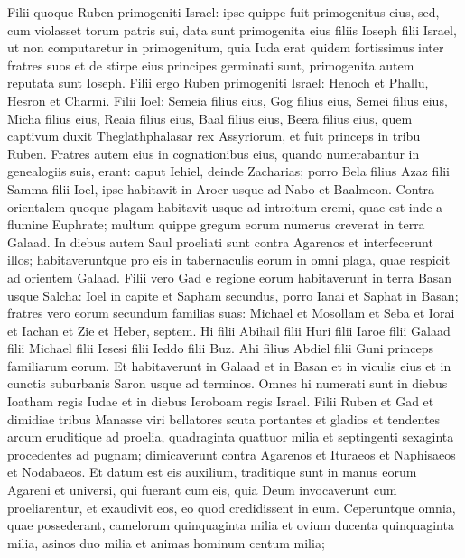 \begin{biblechapter}  
\verse Filii quoque Ruben primogeniti Israel: ipse quippe fuit primogenitus eius, sed, cum violasset torum patris sui, data sunt primogenita eius filiis Ioseph filii Israel, ut non computaretur in primogenitum, 
\verse quia Iuda erat quidem fortissimus inter fratres suos et de stirpe eius principes germinati sunt, primogenita autem reputata sunt Ioseph. 
\verse Filii ergo Ruben primogeniti Israel: Henoch et Phallu, Hesron et Charmi. 
\verse Filii Ioel: Semeia filius eius, Gog filius eius, Semei filius eius, 
\verse Micha filius eius, Reaia filius eius, Baal filius eius, 
\verse Beera filius eius, quem captivum duxit Theglathphalasar rex Assyriorum, et fuit princeps in tribu Ruben. 
\verse Fratres autem eius in cognationibus eius, quando numerabantur in genealogiis suis, erant: caput Iehiel, deinde Zacharias; 
\verse porro Bela filius Azaz filii Samma filii Ioel, ipse habitavit in Aroer usque ad Nabo et Baalmeon.  
\verse Contra orientalem quoque plagam habitavit usque ad introitum eremi, quae est inde a flumine Euphrate; multum quippe gregum eorum numerus creverat in terra Galaad. 
\verse In diebus autem Saul proeliati sunt contra Agarenos et interfecerunt illos; habitaveruntque pro eis in tabernaculis eorum in omni plaga, quae respicit ad orientem Galaad. 
\verse Filii vero Gad e regione eorum habitaverunt in terra Basan usque Salcha:  
\verse Ioel in capite et Sapham secundus, porro Ianai et Saphat in Basan; 
\verse fratres vero eorum secundum familias suas: Michael et Mosollam et Seba et Iorai et Iachan et Zie et Heber, septem. 
\verse Hi filii Abihail filii Huri filii Iaroe filii Galaad filii Michael filii Iesesi filii Ieddo filii Buz. 
\verse Ahi filius Abdiel filii Guni princeps familiarum eorum. 
\verse Et habitaverunt in Galaad et in Basan et in viculis eius et in cunctis suburbanis Saron usque ad terminos. 
\verse Omnes hi numerati sunt in diebus Ioatham regis Iudae et in diebus Ieroboam regis Israel. 
\verse Filii Ruben et Gad et dimidiae tribus Manasse viri bellatores scuta portantes et gladios et tendentes arcum eruditique ad proelia, quadraginta quattuor milia et septingenti sexaginta procedentes ad pugnam; 
\verse dimicaverunt contra Agarenos et Ituraeos et Naphisaeos et Nodabaeos. 
\verse Et datum est eis auxilium, traditique sunt in manus eorum Agareni et universi, qui fuerant cum eis, quia Deum invocaverunt cum proeliarentur, et exaudivit eos, eo quod credidissent in eum. 
\verse Ceperuntque omnia, quae possederant, camelorum quinquaginta milia et ovium ducenta quinquaginta milia, asinos duo milia et animas hominum centum milia; 

\end{biblechapter}
